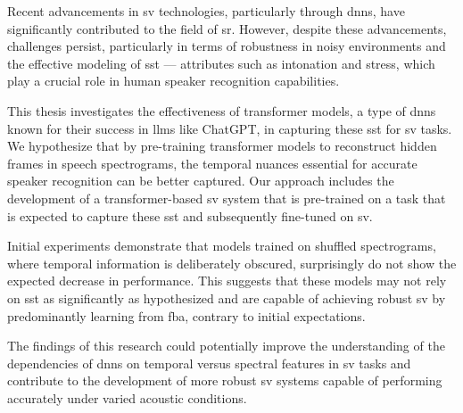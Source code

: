 
Recent advancements in \gls{sv} technologies, particularly through \glspl{dnn}, have significantly contributed to the field of \gls{sr}. However, despite these advancements, challenges persist, particularly in terms of robustness in noisy environments and the effective modeling of \gls{sst} — attributes such as intonation and stress, which play a crucial role in human speaker recognition capabilities.

This thesis investigates the effectiveness of transformer models, a type of \glspl{dnn} known for their success in \glspl{llm} like ChatGPT, in capturing these \gls{sst} for \gls{sv} tasks. We hypothesize that by pre-training transformer models to reconstruct hidden frames in speech spectrograms, the temporal nuances essential for accurate speaker recognition can be better captured. Our approach includes the development of a transformer-based \gls{sv} system that is pre-trained on a task that is expected to capture these \gls{sst} and subsequently fine-tuned on \gls{sv}.

Initial experiments demonstrate that models trained on shuffled spectrograms, where temporal information is deliberately obscured, surprisingly do not show the expected decrease in performance. This suggests that these models may not rely on \gls{sst} as significantly as hypothesized and are capable of achieving robust \gls{sv} by predominantly learning from \gls{fba}, contrary to initial expectations.

The findings of this research could potentially improve the understanding of the dependencies of \glspl{dnn} on temporal versus spectral features in \gls{sv} tasks and contribute to the development of more robust \gls{sv} systems capable of performing accurately under varied acoustic conditions.

\glsresetall %
